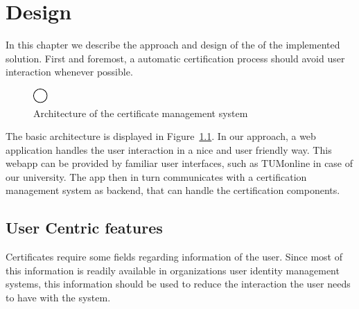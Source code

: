 \chapter{Design}\label{ch:design}

In this chapter we describe the approach and design of the of the implemented solution.
First and foremost, a automatic certification process should avoid user interaction whenever possible.

\begin{figure}
    \centering
    \includegraphics[width=.8\textwidth]{figures/test.pdf} %
    \caption{Architecture of the certificate management system}
    \label{fig:systemArchitecture}
\end{figure}

The basic architecture is displayed in Figure~\ref{fig:systemArchitecture}.
In our approach, a web application handles the user interaction in a nice and user friendly way.
This webapp can be provided by familiar user interfaces, such as TUMonline in case of our university.
The app then in turn communicates with a certification management system as backend, that can handle the certification
components.

\section{User Centric features}\label{sec:userDetails}
Certificates require some fields regarding information of the user.
Since most of this information is readily available in organizations user identity management systems, this information
should be used to reduce the interaction the user needs to have with the system.

